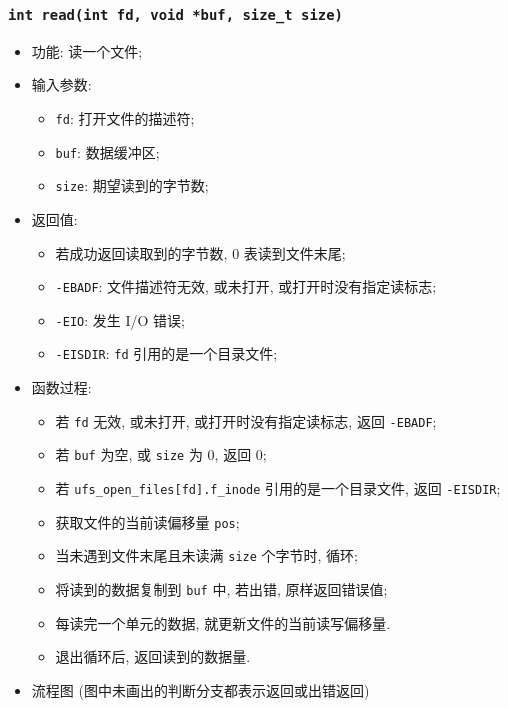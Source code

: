 \documentclass[nofonts]{ctexart}
\begin{document}
  \subsubsection[\texttt{read}]{\texttt{int read(int fd, void *buf, size\_t size)}}
  \begin{itemize}
\item
  功能: 读一个文件;
\item
  输入参数:

  \begin{itemize}
  \item
    \texttt{fd}: 打开文件的描述符;
  \item
    \texttt{buf}: 数据缓冲区;
  \item
    \texttt{size}: 期望读到的字节数;
  \end{itemize}
\item
  返回值:

  \begin{itemize}
  \item
    若成功返回读取到的字节数, 0 表读到文件末尾;
  \item
    \texttt{-EBADF}: 文件描述符无效, 或未打开, 或打开时没有指定读标志;
  \item
    \texttt{-EIO}: 发生 I/O 错误;
  \item
    \texttt{-EISDIR}: \texttt{fd} 引用的是一个目录文件;
  \end{itemize}
\item
  函数过程:

  \begin{itemize}
  \item
    若 \texttt{fd} 无效, 或未打开, 或打开时没有指定读标志, 返回
    \texttt{-EBADF};
  \item
    若 \texttt{buf} 为空, 或 \texttt{size} 为 0, 返回 0;
  \item
    若 \texttt{ufs\_open\_files{[}fd{]}.f\_inode} 引用的是一个目录文件,
    返回 \texttt{-EISDIR};
  \item
    获取文件的当前读偏移量 \texttt{pos};
  \item
    当未遇到文件末尾且未读满 \texttt{size} 个字节时, 循环;
  \item
    将读到的数据复制到 \texttt{buf} 中, 若出错, 原样返回错误值;
  \item
    每读完一个单元的数据, 就更新文件的当前读写偏移量.
  \item
    退出循环后, 返回读到的数据量.
  \end{itemize}
\item
  流程图
  (图中未画出的判断分支都表示返回或出错返回)


\end{itemize}
\end{document}

